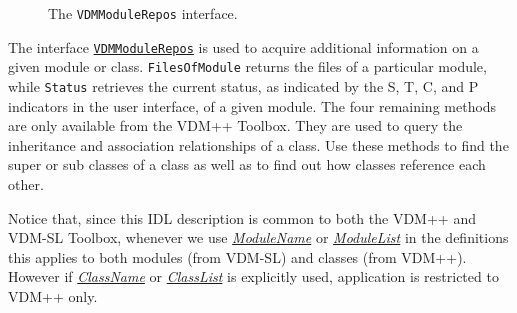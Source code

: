 \documentclass[\pformat,12pt]{article}
\newcommand{\ModuleName}{\hyperlink{type.ModuleName}{ModuleName}}
\newcommand{\ModuleList}{\hyperlink{type.ModuleList}{ModuleList}}
\newcommand{\ClassName}{\hyperlink{type.ClassName}{ClassName}}
\newcommand{\ClassList}{\hyperlink{type.ClassList}{ClassList}}
\newcommand{\VDMModuleRepos}{\hyperlink{interface.VDMModuleRepos}{VDMModuleRepos}}
\begin{document}
\begin{figure}[tbh]
\begin{center}
\mbox{}
\caption{The {\tt VDMModuleRepos} interface.}\label{fig:VDMModuleRepos}
\end{center}
\end{figure}


The interface {\tt \VDMModuleRepos} is used to acquire additional
information on a given module or class. {\tt FilesOfModule} returns
the files of a particular module, while {\tt Status} retrieves the
current status, as indicated by the S, T, C, and P indicators in the
user interface, of a given module. The four remaining methods are only
available from the VDM++ Toolbox. They are used to query the
inheritance and association relationships of a class. Use these
methods to find the super or sub classes of a class as well as to find
out how classes reference each other.  

Notice that, since this IDL description is common to both the VDM++
and VDM-SL Toolbox, whenever we use {\em \ModuleName} or {\em \ModuleList} in the
definitions this applies to both modules (from VDM-SL) and classes
(from VDM++). However if {\em \ClassName} or {\em \ClassList} is explicitly used,
application is restricted to VDM++ only.
\end{document}
